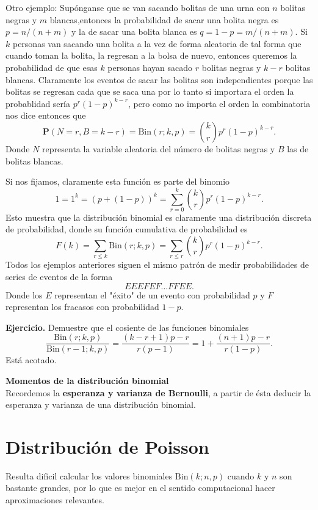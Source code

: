 \documentclass[letterpaper]{book}
\newcommand{\prob}{\textbf{P}}
\newcommand{\eje}{{\newline \noindent \sc \textbf{Ejercicio. }}}
\begin{document}
Otro ejemplo: Supónganse que se van sacando bolitas de una urna con \(n\) bolitas negras y \(m\) blancas,entonces la probabilidad de sacar una bolita negra es \(p=n/(n+m)\) y la de sacar una bolita blanca es \(q=1-p=m/(n+m)\). Si \(k\) personas van sacando una bolita a la vez de forma aleatoria de tal forma que cuando toman la bolita, la regresan a la bolsa de nuevo, entonces queremos la probabilidad de que esas \(k\) personas hayan sacado \(r\) bolitas negras y \(k-r\) bolitas blancas.
Claramente los eventos de sacar las bolitas son independientes porque las bolitas se regresan cada que se saca una por lo tanto si importara el orden la probablidad sería \(p^r(1-p)^{k-r}\), pero como no importa el orden la combinatoria nos dice entonces que
\[
\prob(N=r,B=k-r)=\mathrm{Bin}(r;k,p)={k\choose r}p^r(1-p)^{k-r}.
\]
\noindent Donde \(N\) representa la variable aleatoria del número de bolitas negras y \(B\) las de bolitas blancas. 

Si nos fijamos, claramente esta función es parte del binomio
\[
1=1^k=(p+(1-p))^k=\sum_{r=0}^k{k\choose r}p^r(1-p)^{k-r}.
\]
\noindent Esto muestra que la distribución binomial es claramente una distribución discreta de probabilidad, donde su función cumulativa de probabilidad es
\[
F(k)=\sum_{r\leq k}\mathrm{Bin}(r;k,p)=\sum_{r\leq r}{k\choose r}p^r(1-p)^{k-r}.
\]
Todos los ejemplos anteriores siguen el mismo patrón de medir probabilidades de series de eventos de la forma
\[
EEEFEF\dots FFEE.
\]
\noindent Donde los \(E\) representan el "éxito" de un evento con probabilidad \(p\) y \(F\) representan los fracasos con probabilidad \(1-p\).

\eje Demuestre que el cosiente de las funciones binomiales
\[
\frac{\mathrm{Bin}(r;k,p)}{\mathrm{Bin}(r-1;k,p)}=\frac{(k-r+1)p-r}{r(p-1)}=1+\frac{(n+1)p-r}{r(1-p)}.
\]
\noindent Está acotado.

\noindent \textbf{\Large Momentos de la distribución binomial}\\
Recordemos la \textbf{esperanza y varianza de Bernoulli}, a partir de ésta deducir la esperanza y varianza de una distribución binomial.
\section{Distribución de Poisson}
\label{sec:org39abb14}
Resulta dificil calcular los valores binomiales \(\textrm{Bin}(k;n,p)\) cuando \(k\) y \(n\) son bastante grandes, por lo que es mejor en el sentido computacional hacer aproximaciones relevantes.
\end{document}
